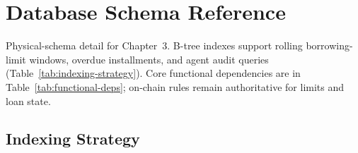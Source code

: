\documentclass[12pt, a4paper]{report}
\begin{document}
\appendix

\chapter{Database Schema Reference}
\label{app:db-schema-reference}

Physical-schema detail for Chapter~3. B-tree indexes support rolling borrowing-limit windows, overdue installments, and agent audit queries (Table~\ref{tab:indexing-strategy}). Core functional dependencies are in Table~\ref{tab:functional-deps}; on-chain rules remain authoritative for limits and loan state.

\section{Indexing Strategy}
\end{document}
